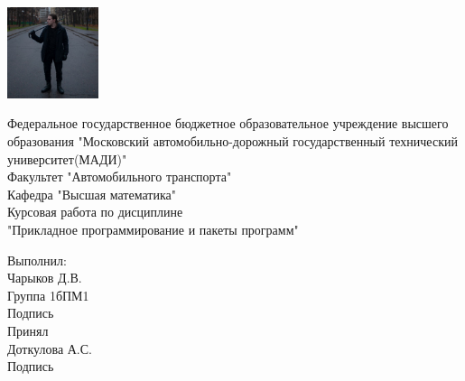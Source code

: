 \begin{titlepage}
\begin{center}
\includegraphics[width=0.2\textwidth]{loks.jpg}
\end{center}

\begin{center}
\LARGE
Федеральное государственное бюджетное образовательное 
учреждение высшего образования "Московский автомобильно-дорожный 
государственный технический университет(МАДИ)"\\

\vspace{2cm}
Факультет "Автомобильного транспорта"\\
Кафедра "Высшая математика"\\


\vspace{2cm}
Курсовая работа по дисциплине\\
"Прикладное программирование и пакеты программ"\\
\end{center}

\vfill
\begin{flushright}
    
Выполнил:\\
Чарыков Д.В.\\
Группа 1бПМ1\\
Подпись\\
\vspace{1cm}
Принял\\
Доткулова А.С.\\
\vspace{1cm}
Подпись
\end{flushright}
\end{titlepage}